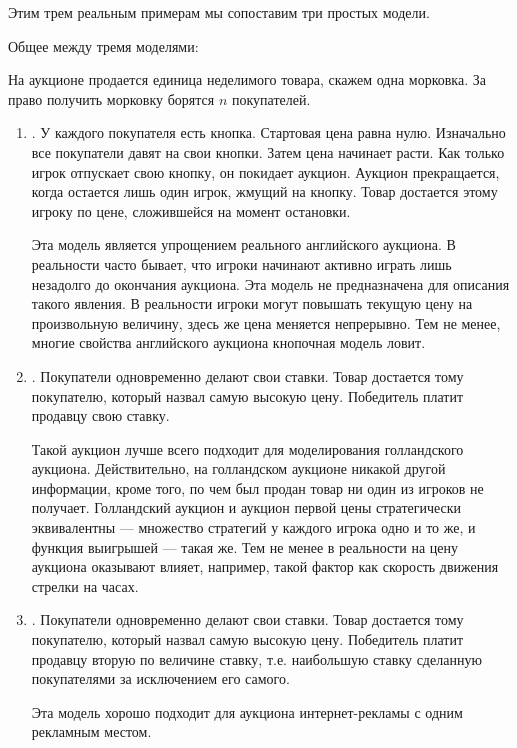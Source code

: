 \begin{itemize}
\end{itemize}

Этим трем реальным примерам мы сопоставим три простых модели.


Общее между тремя моделями: 

На аукционе продается единица неделимого товара, скажем одна морковка. За право получить морковку борятся $ n $ покупателей.




\begin{enumerate}
\item {}. У каждого покупателя есть кнопка. Стартовая цена равна нулю. Изначально все покупатели давят на свои кнопки. Затем цена начинает расти. Как только игрок отпускает свою кнопку, он покидает аукцион. Аукцион прекращается, когда остается лишь один игрок, жмущий на кнопку. Товар достается этому игроку по цене, сложившейся на момент остановки.

Эта модель является упрощением реального английского аукциона. В реальности часто бывает, что игроки начинают активно играть лишь незадолго до окончания аукциона. Эта модель не предназначена для описания такого явления. В реальности игроки могут повышать текущую цену на произвольную величину, здесь же цена меняется непрерывно. Тем не менее, многие свойства английского аукциона кнопочная модель ловит.

\item {}. Покупатели одновременно делают свои ставки. Товар достается тому покупателю, который назвал самую высокую цену. Победитель платит продавцу свою ставку.

Такой аукцион лучше всего подходит для моделирования голландского аукциона. Действительно, на голландском аукционе никакой другой информации, кроме того, по чем был продан товар ни один из игроков не получает. Голландский аукцион и аукцион первой цены стратегически эквивалентны --- множество стратегий у каждого игрока одно и то же, и функция выигрышей --- такая же. Тем не менее в реальности на цену аукциона оказывают влияет, например, такой фактор как скорость движения стрелки на часах.
\item {}. Покупатели одновременно делают свои ставки. Товар достается тому покупателю, который назвал самую высокую цену. Победитель платит продавцу вторую по величине ставку, т.е. наибольшую ставку сделанную покупателями за исключением его самого.

Эта модель хорошо подходит для аукциона интернет-рекламы с одним рекламным местом.
\end{enumerate}

